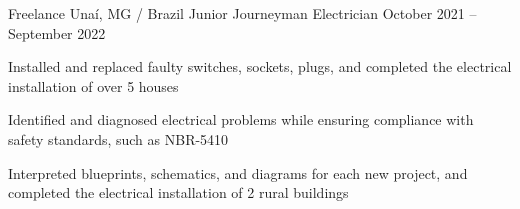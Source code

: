 

\begin{cventries}

  \cventry
    {Freelance} %
    {Unaí, MG / Brazil} %
    {Junior Journeyman Electrician} %
    {October 2021 -- September 2022} %
    {
      \begin{cvitems} %
			\item Installed and replaced faulty switches, sockets, plugs, and completed the electrical installation of over 5 houses
			\item Identified and diagnosed electrical problems while ensuring compliance with safety standards, such as NBR-5410
			\item Interpreted blueprints, schematics, and diagrams for each new project, and completed the electrical installation of 2 rural buildings
      \end{cvitems}
    }
\end{cventries}
